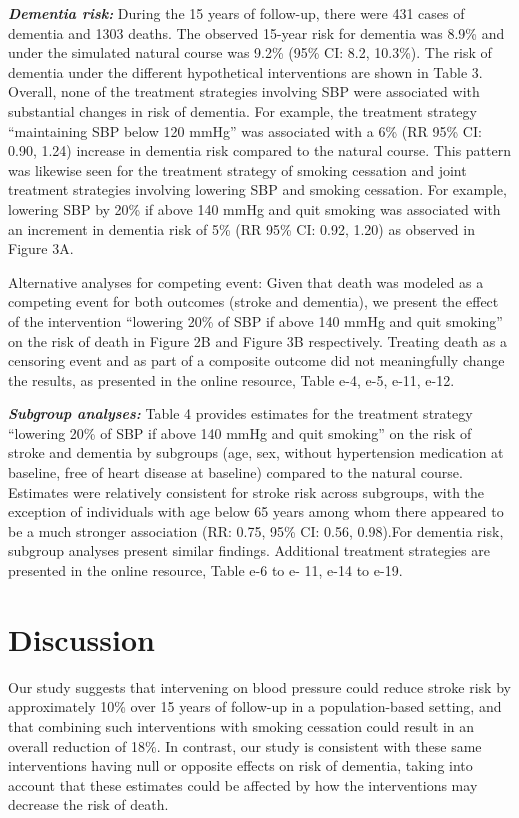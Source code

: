 \documentclass[
]{book}
\begin{document}
\textbf{\emph{Dementia risk:}} During the 15 years of follow-up, there were 431 cases of dementia and 1303 deaths. The observed 15-year risk for dementia was 8.9\% and under the simulated natural course was 9.2\% (95\% CI: 8.2, 10.3\%). The risk of dementia under the different hypothetical interventions are shown in Table 3. Overall, none of the treatment strategies involving SBP were associated with substantial changes in risk of dementia. For example, the treatment strategy ``maintaining SBP below 120 mmHg'' was associated with a 6\% (RR 95\% CI: 0.90, 1.24) increase in dementia risk compared to the natural course. This pattern was likewise seen for the treatment strategy of smoking cessation and joint treatment strategies involving lowering SBP and smoking cessation. For example, lowering SBP by 20\% if above 140 mmHg and quit smoking was associated with an increment in dementia risk of 5\% (RR 95\% CI: 0.92, 1.20) as observed in Figure 3A.

Alternative analyses for competing event: Given that death was modeled as a competing event for both outcomes (stroke and dementia), we present the effect of the intervention ``lowering 20\% of SBP if above 140 mmHg and quit smoking'' on the risk of death in Figure 2B and Figure 3B respectively. Treating death as a censoring event and as part of a composite outcome did not meaningfully change the results, as presented in the online resource, Table e-4, e-5, e-11, e-12.

\textbf{\emph{Subgroup analyses:}} Table 4 provides estimates for the treatment strategy ``lowering 20\% of SBP if above 140 mmHg and quit smoking'' on the risk of stroke and dementia by subgroups (age, sex, without hypertension medication at baseline, free of heart disease at baseline) compared to the natural course. Estimates were relatively consistent for stroke risk across subgroups, with the exception of individuals with age below 65 years among whom there appeared to be a much stronger association (RR: 0.75, 95\% CI: 0.56, 0.98).For dementia risk, subgroup analyses present similar findings. Additional treatment strategies are presented in the online resource, Table e-6 to e- 11, e-14 to e-19.

\hypertarget{discussion-1}{%
\section{Discussion}\label{discussion-1}}

Our study suggests that intervening on blood pressure could reduce stroke risk by approximately 10\% over 15 years of follow-up in a population-based setting, and that combining such interventions with smoking cessation could result in an overall reduction of 18\%. In contrast, our study is consistent with these same interventions having null or opposite effects on risk of dementia, taking into account that these estimates could be affected by how the interventions may decrease the risk of death.
\end{document}
